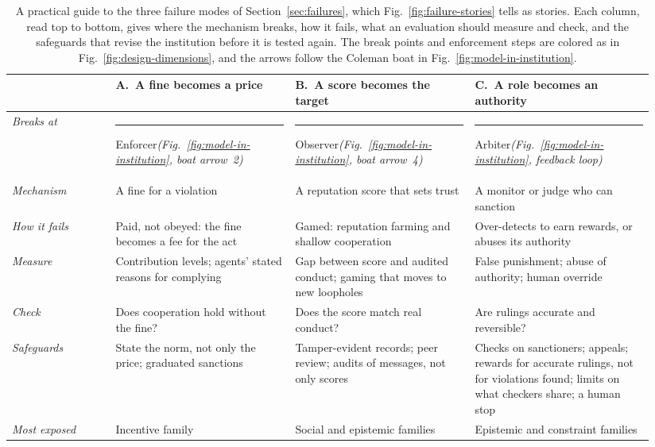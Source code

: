 \documentclass[runningheads]{llncs}
\newcommand{\fnmark}[1]{\textcolor{#1}{\rule{0.62em}{0.62em}}\nobreak\hspace{0.35em}}
\newcommand{\rowline}{\arrayrulecolor{black!22}\specialrule{0.4pt}{2pt}{2pt}\arrayrulecolor{black}}
\begin{document}
\begin{table}[!tbp]
\centering
\caption{A practical guide to the three failure modes of Section~\mbox{\ref{sec:failures}}, which Fig.~\mbox{\ref{fig:failure-stories}} tells as stories. Each column, read top to bottom, gives where the mechanism breaks, how it fails, what an evaluation should measure and check, and the safeguards that revise the institution before it is tested again. The break points and enforcement steps are colored as in Fig.~\mbox{\ref{fig:design-dimensions}}, and the arrows follow the Coleman boat in Fig.~\mbox{\ref{fig:model-in-institution}}.}
\label{tab:failure-guide}
\footnotesize
\renewcommand{\arraystretch}{1.15}
\setlength{\tabcolsep}{4pt}
\begin{tabular}{@{}>{\raggedright\arraybackslash}p{0.15\linewidth} >{\raggedright\arraybackslash}p{0.262\linewidth} >{\raggedright\arraybackslash}p{0.262\linewidth} >{\raggedright\arraybackslash}p{0.262\linewidth}@{}}
\toprule
 & \textbf{A.~A fine becomes a price} & \textbf{B.~A score becomes the target} & \textbf{C.~A role becomes an authority} \\
\midrule
\emph{Breaks at} & \fnmark{fncons}Enforcer\newline \emph{(Fig.~\mbox{\ref{fig:model-in-institution}}, boat arrow~2)} & \fnmark{fninfo}Observer\newline \emph{(Fig.~\mbox{\ref{fig:model-in-institution}}, boat arrow~4)} & \fnmark{fncons}Arbiter\newline \emph{(Fig.~\mbox{\ref{fig:model-in-institution}}, feedback loop)} \\ \rowline
\emph{Mechanism} & A fine for a violation & A reputation score that sets trust & A monitor or judge who can sanction \\ \rowline
\emph{How it fails} & Paid, not obeyed: the fine becomes a fee for the act & Gamed: reputation farming and shallow cooperation & Over-detects to earn rewards, or abuses its authority \\ \rowline
\emph{Measure} & Contribution levels; agents' stated reasons for complying & Gap between score and audited conduct; gaming that moves to new loopholes & False punishment; abuse of authority; human override \\ \rowline
\emph{Check} & Does cooperation hold without the fine? & Does the score match real conduct? & Are rulings accurate and reversible? \\ \rowline
\emph{Safeguards} & State the norm, not only the price; graduated sanctions & Tamper-evident records; peer review; audits of messages, not only scores & Checks on sanctioners; appeals; rewards for accurate rulings, not for violations found; limits on what checkers share; a human stop \\ \rowline
\emph{Most exposed} & Incentive family & Social and epistemic families & Epistemic and constraint families \\
\bottomrule
\end{tabular}
\end{table}
\end{document}
